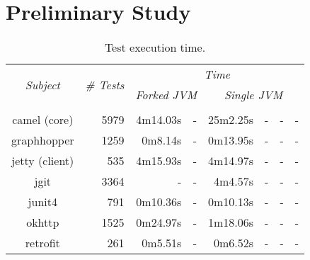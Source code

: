 \section{Preliminary Study}

\begin{table*}[t]
  \centering
  \begin{tabular}{|c|r|r|r|r|r|r|r|}
    \hline
    \multirow{2}{*}{\emph{Subject}} & \multirow{2}{*}{\emph{\# Tests}} &  \multicolumn{6}{c|}{\emph{Time}}\\
    \cline{3-8}
    & & \multicolumn{2}{c|}{\emph{Forked JVM}} & \multicolumn{4}{c|}{\emph{Single JVM}}   \\
    \cline{3-8}
    & & \multicolumn{1}{c|}{\Seq{}} & \multicolumn{1}{c|}{\ParClassSeqMeth{}} & \multicolumn{1}{c|}{\Seq{}} & \multicolumn{1}{c|}{\ParClassSeqMeth{}} & \multicolumn{1}{c|}{\SeqClassParMeth{}} & \multicolumn{1}{c|}{\ParClassParMeth{}}\\     \hline
    camel (core) & 5979 & 4m14.03s & - & 25m2.25s & - & - & - \\
    \hline
    graphhopper & 1259 & 0m8.14s & - & 0m13.95s & - & - & - \\
    \hline
    jetty (client) & 535 & 4m15.93s & - & 4m14.97s & - & - & - \\
    \hline
    jgit & 3364 & - & - & 4m4.57s & - & - & - \\
    \hline
    junit4 & 791 & 0m10.36s & - & 0m10.13s & - & - & - \\
    \hline
    okhttp & 1525 & 0m24.97s & - & 1m18.06s & - & - & - \\
    \hline
    retrofit & 261 & 0m5.51s & - & 0m6.52s & - & - & - \\
    \hline
  \end{tabular}
  \caption{\label{table:cost}Test execution time.}
\end{table*}

